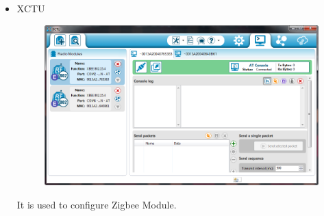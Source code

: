 \documentclass[a4paper,12pt,oneside]{book}
\begin{document}
\begin{itemize}
\begin{itemize}
  \item XCTU
	     \begin{figure}[h]
        \centering
    	\includegraphics[scale=0.5]{xctu.png}
	    \end{figure}
  
  It is used to configure Zigbee Module.
  
 \end{itemize} 
\end{itemize}

\newpage
\end{document}
